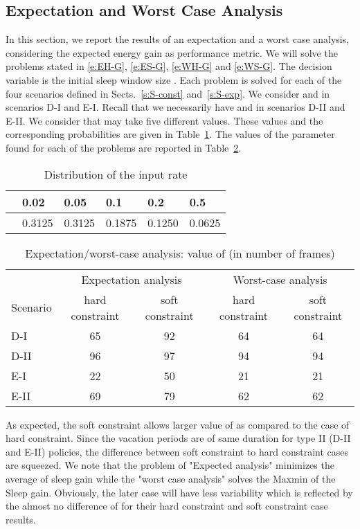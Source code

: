 \documentclass[journal]{IEEEtran}
\begin{document}
\subsection{Expectation and Worst Case Analysis}
\label{s:WorstExp}
In this section, we report the results of an expectation and a worst case analysis, considering the expected energy gain as performance metric. We will solve the problems stated in \eqref{e:EH-G},
\eqref{e:ES-G}, \eqref{e:WH-G} and \eqref{e:WS-G}. The decision variable is the initial sleep window size . Each problem is solved for each of the four scenarios defined in Sects.~\ref{s:S-const} and~\ref{s:S-exp}. We consider  and  in scenarios D-I and E-I. Recall that we necessarily have  and  in scenarios D-II and E-II. We consider that  may take five different values. These values and the corresponding probabilities  are given in Table~\ref{t:lambda}. The values of the parameter  found for each of the problems are reported in Table~\ref{t:Tmin}.
\begin{table}[tbh]
\begin{center}
\caption{Distribution of the input rate }
\label{t:lambda}{ \scriptsize

\begin{tabular}{|l||lllll|}
\hline
 & 0.02 & 0.05 & 0.1 & 0.2 & 0.5 \\
\hline
 & 0.3125 & 0.3125 & 0.1875 & 0.1250 & 0.0625 \\
\hline
\end{tabular} }
\end{center}
\end{table}
\begin{table}[tbh]
\begin{center}
\caption{Expectation/worst-case analysis: value of  (in number of frames)}
\label{t:Tmin}{ \scriptsize
\begin{tabular}{|l||c|c|c|c|}
\hline
& \multicolumn{2}{c|}{Expectation analysis} &\multicolumn{2}{c|}{Worst-case analysis} \\
Scenario & hard constraint & soft constraint & hard constraint & soft constraint \\
\hline
D-I & 65 & 92 & 64 & 64 \\
D-II & 96 & 97 & 94 & 94 \\
E-I & 22 & 50 & 21 & 21 \\
E-II & 69 & 79 & 62 & 62 \\
\hline
\end{tabular} }
\end{center}
\end{table}
As expected, the soft constraint allows larger value of  as compared to the case of hard constraint. Since the vacation periods are of same duration for type II (D-II and E-II) policies, the difference between soft constraint to hard constraint cases are squeezed. We note that the problem of "Expected analysis" minimizes the average of sleep gain while the "worst case analysis" solves the Maxmin of the Sleep gain. Obviously, the later case will have less variability which is reflected by the almost no difference of  for their hard constraint and soft constraint case results. 
\end{document}
